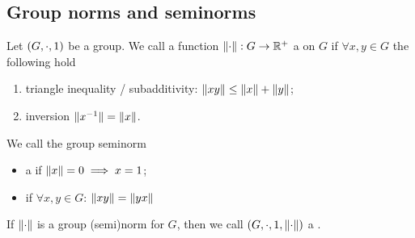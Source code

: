 \subsection{Group norms and seminorms}
\begin{definition}
Let $\sSet{G, \cdot, 1}$ be a group. We call a function $\lVert\cdot\rVert: G\to \mathbb{R}^+$ a  on $G$ if $\forall x,y\in G$ the following hold
\begin{enumerate}
\item triangle inequality / subadditivity: $\lVert xy\rVert \leq \lVert x\rVert + \lVert y\rVert$;
\item inversion $\lVert x^{-1}\rVert = \lVert x\rVert$.
\end{enumerate}
We call the group seminorm
\begin{itemize}
\item a  if $\lVert x\rVert = 0 \implies x = 1$;
\item {} if $\forall x,y\in G$: $\lVert xy\rVert = \lVert yx\rVert$
\end{itemize}

If $\lVert\cdot\rVert$ is a group (semi)norm for $G$, then we call $\sSet{G, \cdot, 1, \norm{\cdot}}$ a .
\end{definition}

